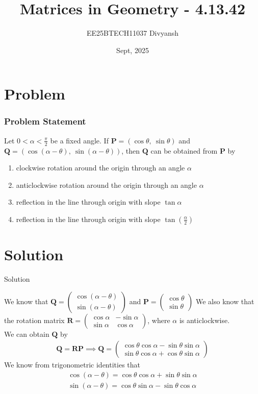 \documentclass{beamer}
\title{Matrices in Geometry - 4.13.42}
\author{EE25BTECH11037  Divyansh}
\date{Sept, 2025}
\let\vec\mathbf
\providecommand{\brak}[1]{\ensuremath{\left(#1\right)}}
\theoremstyle{remark}
\newcommand{\myvec}[1]{\ensuremath{\begin{pmatrix}#1\end{pmatrix}}}
\begin{document}
\maketitle


\section{Problem}
\begin{frame}
\frametitle{Problem Statement}
Let $0<\alpha<\frac{\pi}{2}$ be a fixed angle. If $\vec{P}=\brak{\cos{\theta},\  \sin{\theta}}$ and $\vec{Q} = \brak{\cos{\brak{\alpha - \theta}}, \ \sin{\brak{\alpha - \theta}}}$, then $\vec{Q}$ can be obtained from $\vec{P}$ by
\begin{enumerate}[label=(\alph*)]
    \item clockwise rotation around the origin through an angle $\alpha$
    \item anticlockwise rotation around the origin through an angle $\alpha$
    \item reflection in the line through origin with slope $\tan\alpha$
    \item reflection in the line through origin with slope $\tan\brak{\frac{\alpha}{2}}$
\end{enumerate}
\end{frame}

\section{Solution}
\begin{frame}{Solution}
   
We know that $\vec{Q}=\myvec{\cos{\brak{\alpha - \theta}} \\ \sin{\brak{\alpha - \theta}}}$ and $\vec{P}=\myvec{\cos{\theta}\\ \sin{\theta}}$
We also know that the rotation matrix $\vec{R}=\myvec{\cos\alpha & -\sin\alpha \\ \sin{\alpha} & \cos\alpha}$, where $\alpha$ is anticlockwise.
\\ We can obtain $\vec{Q}$ by
\begin{align}
    \vec{Q}=\vec{R}\vec{P} \implies \vec{Q}=\myvec{\cos\theta\cos\alpha - \sin\theta\sin\alpha \\ \sin\theta\cos\alpha +\cos\theta\sin\alpha   } 
\end{align}
We know from trigonometric identities that
\begin{align}
    \cos{\brak{\alpha-\theta}}=\cos\theta\cos\alpha + \sin\theta\sin\alpha \\\sin{\brak{\alpha-\theta}}=\cos\theta\sin\alpha - \sin\theta\cos\alpha
\end{align}
\end{frame}
\end{document}
